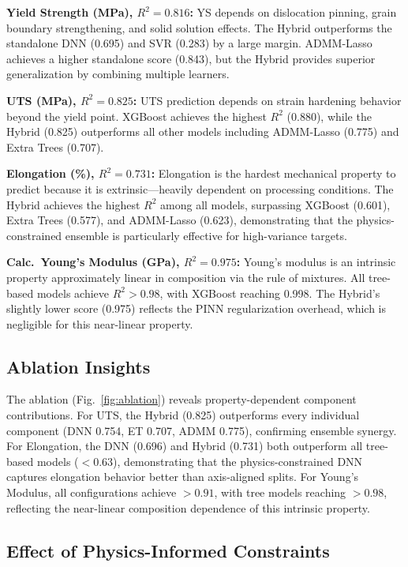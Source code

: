 \documentclass[conference]{IEEEtran}
\begin{document}
\textbf{Yield Strength (MPa), $R^2=0.816$:} YS depends on dislocation pinning, grain boundary strengthening, and solid solution effects. The Hybrid outperforms the standalone DNN (0.695) and SVR (0.283) by a large margin. ADMM-Lasso achieves a higher standalone score (0.843), but the Hybrid provides superior generalization by combining multiple learners.

\textbf{UTS (MPa), $R^2=0.825$:} UTS prediction depends on strain hardening behavior beyond the yield point. XGBoost achieves the highest $R^2$ (0.880), while the Hybrid (0.825) outperforms all other models including ADMM-Lasso (0.775) and Extra Trees (0.707).

\textbf{Elongation (\%), $R^2=0.731$:} Elongation is the hardest mechanical property to predict because it is extrinsic---heavily dependent on processing conditions. The Hybrid achieves the highest $R^2$ among all models, surpassing XGBoost (0.601), Extra Trees (0.577), and ADMM-Lasso (0.623), demonstrating that the physics-constrained ensemble is particularly effective for high-variance targets.

\textbf{Calc.\ Young's Modulus (GPa), $R^2=0.975$:} Young's modulus is an intrinsic property approximately linear in composition via the rule of mixtures. All tree-based models achieve $R^2 > 0.98$, with XGBoost reaching 0.998. The Hybrid's slightly lower score (0.975) reflects the PINN regularization overhead, which is negligible for this near-linear property.

\subsection{Ablation Insights}

The ablation (Fig.~\ref{fig:ablation}) reveals property-dependent component contributions. For UTS, the Hybrid (0.825) outperforms every individual component (DNN 0.754, ET 0.707, ADMM 0.775), confirming ensemble synergy. For Elongation, the DNN (0.696) and Hybrid (0.731) both outperform all tree-based models ($<0.63$), demonstrating that the physics-constrained DNN captures elongation behavior better than axis-aligned splits. For Young's Modulus, all configurations achieve $>0.91$, with tree models reaching $>0.98$, reflecting the near-linear composition dependence of this intrinsic property.

\subsection{Effect of Physics-Informed Constraints}
\end{document}

